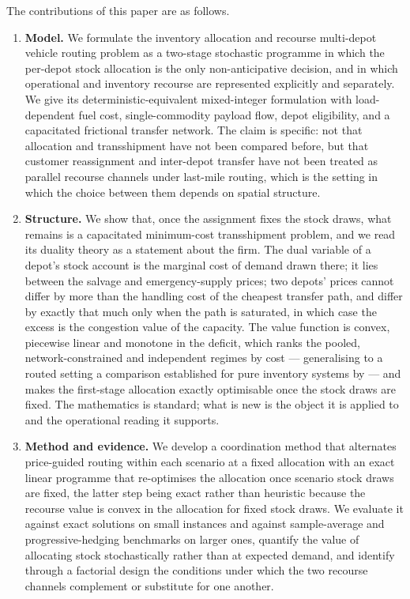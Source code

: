 \documentclass[authoryear,final,3p,times]{elsarticle}
\theoremstyle{definition}
\theoremstyle{plain}
\begin{document}
The contributions of this paper are as follows.

\begin{enumerate}
\item \textbf{Model.} We formulate the inventory allocation and recourse
multi-depot vehicle routing problem as a two-stage stochastic programme in
which the per-depot stock allocation is the only non-anticipative decision, and
in which operational and inventory recourse are represented explicitly and
separately. We give its deterministic-equivalent mixed-integer formulation with
load-dependent fuel cost, single-commodity payload flow, depot eligibility, and
a capacitated frictional transfer network. The claim is specific: not that
allocation and transshipment have not been compared before, but that customer
reassignment and inter-depot transfer have not been treated as parallel
recourse channels under last-mile routing, which is the setting in which the
choice between them depends on spatial structure.

\item \textbf{Structure.} We show that, once the assignment fixes the stock
draws, what remains is a capacitated minimum-cost transshipment problem, and we
read its duality theory as a statement about the firm. The dual variable of a
depot's stock account is the marginal cost of demand drawn there; it lies
between the salvage and emergency-supply prices; two depots' prices cannot
differ by more than the handling cost of the cheapest transfer path, and differ
by exactly that much only when the path is saturated, in which case the excess
is the congestion value of the capacity. The value function is convex,
piecewise linear and monotone in the deficit, which ranks the pooled,
network-constrained and independent regimes by cost --- generalising to a
routed setting a comparison established for pure inventory systems by
\citet{rosales2013retailer} --- and makes the first-stage allocation exactly
optimisable once the stock draws are fixed. The mathematics is standard; what
is new is the object it is applied to and the operational reading it supports.

\item \textbf{Method and evidence.} We develop a coordination method that
alternates price-guided routing within each scenario at a fixed allocation with
an exact linear programme that re-optimises the allocation once scenario stock
draws are fixed, the latter step being exact rather than heuristic because the
recourse value is convex in the allocation for fixed stock draws. We evaluate
it against exact solutions on small instances and against sample-average
\citep{kleywegt2002sample} and progressive-hedging
\citep{rockafellar1991scenarios} benchmarks on larger ones, quantify the value
of allocating stock stochastically rather than at expected demand, and identify
through a factorial design the conditions under which the two recourse channels
complement or substitute for one another.
\end{enumerate}
\end{document}
